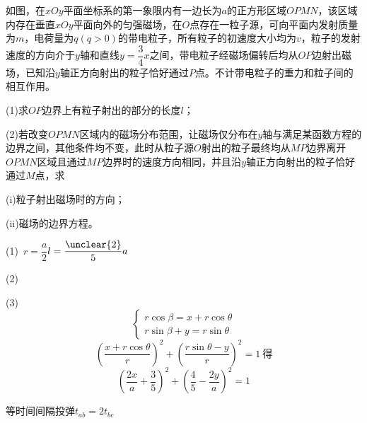 \begin{problem}[25.（19分）]
如图，在$xOy$平面坐标系的第一象限内有一边长为$a$的正方形区域$OPMN$，该区域内存在垂直$xOy$平面向外的匀强磁场，在$O$点存在一粒子源，可向平面内发射质量为$m$，电荷量为$q(q>0)$的带电粒子，所有粒子的初速度大小均为$v$，粒子的发射速度的方向介于$y$轴和直线$y=\dfrac34x$之间，带电粒子经磁场偏转后均从$OP$边射出磁场，已知沿$y$轴正方向射出的粒子恰好通过$P$点。不计带电粒子的重力和粒子间的相互作用。

(1)求$OP$边界上有粒子射出的部分的长度$l$；

(2)若改变$OPMN$区域内的磁场分布范围，让磁场仅分布在$y$轴与满足某函数方程的边界之间，其他条件均不变，此时从粒子源$O$射出的粒子最终均从$MP$边界离开$OPMN$区域且通过$MP$边界时的速度方向相同，并且沿$y$轴正方向射出的粒子恰好通过$M$点，求

(i)粒子射出磁场时的方向；

(ii)磁场的边界方程。

\begin{solution}
(1)\ $r=\dfrac{a}{2}$\quad {}\quad $l=\dfrac{\unclear{2}}{5}a$

(2)\ \red{$\theta=2\alpha$}




(3)
{\color{red!75!black}
\[
\begin{cases}
r\cos\beta=x+r\cos\theta\\
r\sin\beta+y=r\sin\theta
\end{cases}
\]
\[
\left(\frac{x+r\cos\theta}{r}\right)^{2}+\left(\frac{r\sin\theta-y}{r}\right)^{2}=1\ \text{得}
\]
\[
\left(\frac{2x}{a}+\frac35\right)^{2}+\left(\frac45-\frac{2y}{a}\right)^{2}=1
\]
}
\end{solution}
\end{problem}
\begin{minipage}[t]{0.47\linewidth}
\end{minipage}\hfill
\begin{minipage}[t]{0.50\linewidth}
等时间间隔投弹\quad $t_{ab}=2t_{bc}$
\end{minipage}

